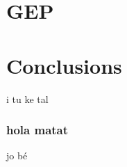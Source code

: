 \documentclass{beamer}
\begin{document}

\section{GEP} %
\label{sec:GEP}

\section{Conclusions} %
\label{sec:Conclusions}
\begin{frame}
	i tu ke tal
\end{frame}

\subsubsection{hola matat} %
\label{ssub:hola matat}
\begin{frame}
	jo bé
\end{frame}





\end{document}
